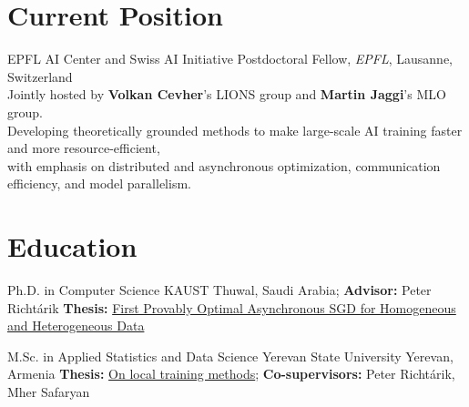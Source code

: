 \documentclass[10pt,a4paper,sans]{moderncv}        %
\newcommand{\peter}{Peter Richt\'{a}rik}
\newcommand{\mher}{Mher Safaryan}
\newcommand{\kaust}{KAUST}
\newcommand{\yerevan}{Yerevan, Armenia}
\newcommand{\thuwal}{Thuwal, Saudi Arabia}
\newcommand{\ysu}{Yerevan State University}
\begin{document}
\makecvtitle 



\section{Current Position}

{EPFL AI Center and Swiss AI Initiative Postdoctoral Fellow,}
{}
{}
{}
{\textit{EPFL}, Lausanne, Switzerland\\
Jointly hosted by \textbf{Volkan Cevher}'s LIONS group and \textbf{Martin Jaggi}'s MLO group.\\
Developing theoretically grounded methods to make large-scale AI training faster and more resource-efficient,\\
with emphasis on distributed and asynchronous optimization, communication efficiency, and model parallelism.}


\section{Education}

{Ph.D. in Computer Science}
{\kaust}
{\thuwal; \textbf{Advisor:} \peter}{}
{\textbf{Thesis:} \href{https://arxiv.org/abs/2601.02523}{First Provably Optimal Asynchronous SGD for Homogeneous and Heterogeneous Data} }


{M.Sc. in Applied Statistics and Data Science}
{\ysu}
{\yerevan}{}
{\textbf{Thesis:} \href{https://artomaranjyan.github.io/assets/pdf/Master_thesis.pdf}{On local training methods}; \textbf{Co-supervisors:} \peter, \mher}

\end{document}
